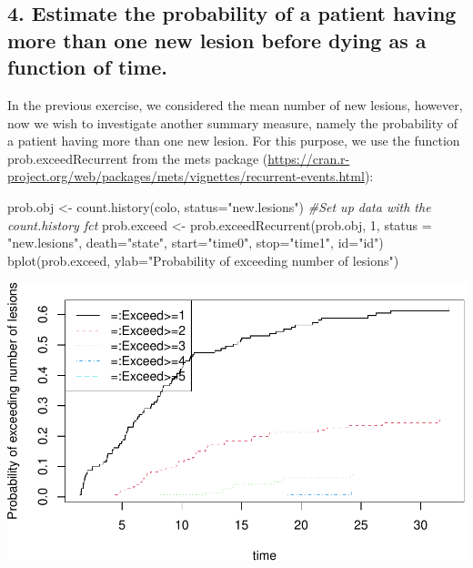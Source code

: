 \documentclass[
  11pt,
]{article}
\newenvironment{Shaded}{\begin{snugshade}}{\end{snugshade}}
\newcommand{\AttributeTok}[1]{\textcolor[rgb]{0.77,0.63,0.00}{#1}}
\newcommand{\CommentTok}[1]{\textcolor[rgb]{0.56,0.35,0.01}{\textit{#1}}}
\newcommand{\DecValTok}[1]{\textcolor[rgb]{0.00,0.00,0.81}{#1}}
\newcommand{\FunctionTok}[1]{\textcolor[rgb]{0.00,0.00,0.00}{#1}}
\newcommand{\NormalTok}[1]{#1}
\newcommand{\OtherTok}[1]{\textcolor[rgb]{0.56,0.35,0.01}{#1}}
\newcommand{\StringTok}[1]{\textcolor[rgb]{0.31,0.60,0.02}{#1}}
\begin{document}
\hypertarget{estimate-the-probability-of-a-patient-having-more-than-one-new-lesion-before-dying-as-a-function-of-time.}{%
\subsection{4. Estimate the probability of a patient having more than
one new lesion before dying as a function of
time.}\label{estimate-the-probability-of-a-patient-having-more-than-one-new-lesion-before-dying-as-a-function-of-time.}}

In the previous exercise, we considered the mean number of new lesions,
however, now we wish to investigate another summary measure, namely the
probability of a patient having more than one new lesion. For this
purpose, we use the function prob.exceedRecurrent from the mets package
(\url{https://cran.r-project.org/web/packages/mets/vignettes/recurrent-events.html}):

\begin{Shaded}
\begin{Highlighting}[]
\NormalTok{prob.obj }\OtherTok{\textless{}{-}} \FunctionTok{count.history}\NormalTok{(colo, }\AttributeTok{status=}\StringTok{"new.lesions"}\NormalTok{) }\CommentTok{\#Set up data with the count.history fct}
\NormalTok{prob.exceed }\OtherTok{\textless{}{-}} \FunctionTok{prob.exceedRecurrent}\NormalTok{(prob.obj, }\DecValTok{1}\NormalTok{, }\AttributeTok{status =} \StringTok{"new.lesions"}\NormalTok{, }
                                    \AttributeTok{death=}\StringTok{"state"}\NormalTok{, }\AttributeTok{start=}\StringTok{"time0"}\NormalTok{, }\AttributeTok{stop=}\StringTok{"time1"}\NormalTok{, }\AttributeTok{id=}\StringTok{"id"}\NormalTok{)}
\FunctionTok{bplot}\NormalTok{(prob.exceed, }\AttributeTok{ylab=}\StringTok{"Probability of exceeding number of lesions"}\NormalTok{)}
\end{Highlighting}
\end{Shaded}

\includegraphics{Exam2021_files/figure-latex/unnamed-chunk-16-1.pdf}
\end{document}
